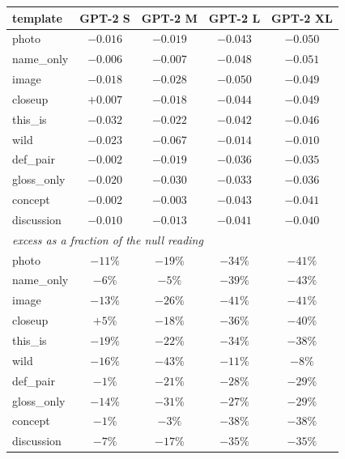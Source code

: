 \begin{table}[H]
\centering
\small
\setlength{\tabcolsep}{4pt}
\begin{tabular}{lcccc}
\toprule
template & GPT-2 S & GPT-2 M & GPT-2 L & GPT-2 XL \\
\midrule
photo & $-0.016$\rlap{$^*$} & $-0.019$\rlap{$^*$} & $-0.043$\rlap{$^*$} & $-0.050$\rlap{$^*$} \\
name\_only & $-0.006$ & $-0.007$ & $-0.048$\rlap{$^*$} & $-0.051$\rlap{$^*$} \\
image & $-0.018$\rlap{$^*$} & $-0.028$\rlap{$^*$} & $-0.050$\rlap{$^*$} & $-0.049$\rlap{$^*$} \\
closeup & $+0.007$ & $-0.018$\rlap{$^*$} & $-0.044$\rlap{$^*$} & $-0.049$\rlap{$^*$} \\
this\_is & $-0.032$\rlap{$^*$} & $-0.022$\rlap{$^*$} & $-0.042$\rlap{$^*$} & $-0.046$\rlap{$^*$} \\
wild & $-0.023$\rlap{$^*$} & $-0.067$\rlap{$^*$} & $-0.014$ & $-0.010$\rlap{$^*$} \\
def\_pair & $-0.002$ & $-0.019$\rlap{$^*$} & $-0.036$\rlap{$^*$} & $-0.035$\rlap{$^*$} \\
gloss\_only & $-0.020$\rlap{$^*$} & $-0.030$\rlap{$^*$} & $-0.033$\rlap{$^*$} & $-0.036$\rlap{$^*$} \\
concept & $-0.002$ & $-0.003$ & $-0.043$\rlap{$^*$} & $-0.041$\rlap{$^*$} \\
discussion & $-0.010$ & $-0.013$\rlap{$^*$} & $-0.041$\rlap{$^*$} & $-0.040$\rlap{$^*$} \\
\midrule
\multicolumn{5}{l}{\emph{excess as a fraction of the null reading}} \\
photo & $-11\%$ & $-19\%$ & $-34\%$ & $-41\%$ \\
name\_only & $-6\%$ & $-5\%$ & $-39\%$ & $-43\%$ \\
image & $-13\%$ & $-26\%$ & $-41\%$ & $-41\%$ \\
closeup & $+5\%$ & $-18\%$ & $-36\%$ & $-40\%$ \\
this\_is & $-19\%$ & $-22\%$ & $-34\%$ & $-38\%$ \\
wild & $-16\%$ & $-43\%$ & $-11\%$ & $-8\%$ \\
def\_pair & $-1\%$ & $-21\%$ & $-28\%$ & $-29\%$ \\
gloss\_only & $-14\%$ & $-31\%$ & $-27\%$ & $-29\%$ \\
concept & $-1\%$ & $-3\%$ & $-38\%$ & $-38\%$ \\
discussion & $-7\%$ & $-17\%$ & $-35\%$ & $-35\%$ \\

\end{tabular}
\end{table}
